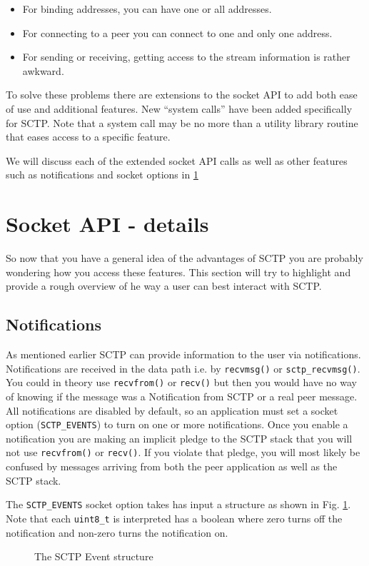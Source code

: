 \documentclass[conference]{IEEEtran}
\begin{document}
\begin{itemize}
 \item  For binding addresses, you can have one or all addresses.
 \item  For connecting to a peer you can connect to one and only one address.
 \item  For sending or receiving, getting access to the stream information is rather awkward.
\end{itemize}

To solve these problems there are extensions to the socket API to add
both ease of use and additional features. New ``system calls'' have been added
specifically for SCTP. Note that a system call may be no more than a utility library
routine that eases access to a specific feature. 

We will discuss each of the extended socket API calls as well as other features such
as notifications and socket options in \ref{adv}


\section{Socket API - details}
\label{adv}
So now that you have a general idea of the advantages of SCTP you are probably
wondering how you access these features. This section will try to highlight and provide
a rough overview of he way a user can best interact with SCTP.

\subsection{Notifications}

As mentioned earlier SCTP can provide information to the user via
notifications. Notifications are received in the data path i.e. by \texttt{recvmsg()} or \texttt{sctp\_recvmsg()}. You
could in theory use \texttt{recvfrom()} or \texttt{recv()} but then you would have no way of knowing if
the message was a Notification from SCTP or a real peer message.  All notifications are disabled by default, so
an application must set a socket option (\texttt{SCTP\_EVENTS}) to turn on one or more notifications. Once you 
enable a notification you are making an implicit pledge to the SCTP stack that you will not use \texttt{recvfrom()} or \texttt{recv()}.
If you violate that pledge, you will most likely be confused by messages arriving from both the peer application as well as
the SCTP stack.

The \texttt{SCTP\_EVENTS} socket option takes has input a structure as shown
in Fig. \ref{fig:events}. Note that each \texttt{uint8\_t}
is interpreted has a boolean where zero turns off the 
notification and non-zero turns the notification on.
\begin{figure}

\caption{The SCTP Event structure}
\label{fig:events}
\end{figure}
\end{document}
